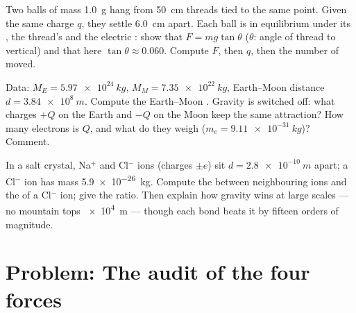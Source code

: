 \begin{exercise}[$\star\star\star$]\label{exo:g11:fundamental-interactions:13}
Two balls of mass \qty{1.0}{g} hang from \qty{50}{cm} threads tied to
the same point. Given the same charge $q$, they settle \qty{6.0}{cm}
apart. Each ball is in equilibrium under its , the thread's
 and the electric : show that $F = mg\tan\theta$ ($\theta$:
angle of thread to vertical) and that here $\tan\theta \approx 0.060$.
Compute $F$, then $q$, then the number of  moved.
\end{exercise}

\begin{exercise}[$\star\star\star$]\label{exo:g11:fundamental-interactions:14}
Data: $M_E = \qty{5.97e24}{kg}$, $M_M = \qty{7.35e22}{kg}$, Earth--Moon
distance $d = \qty{3.84e8}{m}$. Compute the Earth--Moon . Gravity is switched off: what charges $+Q$ on the Earth and $-Q$
on the Moon keep the same attraction? How many electrons is $Q$, and
what do they weigh ($m_e = \qty{9.11e-31}{kg}$)? Comment.
\end{exercise}

\begin{exercise}[$\star\star\star$]\label{exo:g11:fundamental-interactions:15}
In a salt crystal, Na$^{+}$ and Cl$^{-}$ ions (charges $\pm e$) sit
$d = \qty{2.8e-10}{m}$ apart; a Cl$^{-}$ ion has mass \qty{5.9e-26}{kg}.
Compute the  between neighbouring ions and the  of a
Cl$^{-}$ ion; give the ratio. Then explain how gravity wins at large
scales --- no mountain tops \qty{e4}{m} --- though each bond beats it
by fifteen orders of magnitude.
\end{exercise}

\section{Problem: The audit of the four forces}

